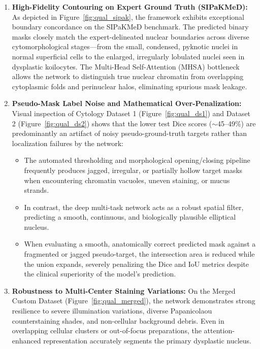 \documentclass[pdflatex,sn-nature]{sn-jnl}%
\theoremstyle{thmstyleone}%
\theoremstyle{thmstyletwo}%
\theoremstyle{thmstylethree}%
\begin{document}
\begin{enumerate}
    \item \textbf{High-Fidelity Contouring on Expert Ground Truth (SIPaKMeD):} 
    As depicted in Figure~\ref{fig:qual_sipak}, the framework exhibits exceptional boundary concordance on the SIPaKMeD benchmark. The predicted binary masks closely match the expert-delineated nuclear boundaries across diverse cytomorphological stages—from the small, condensed, pyknotic nuclei in normal superficial cells to the enlarged, irregularly lobulated nuclei seen in dysplastic koilocytes. The Multi-Head Self-Attention (MHSA) bottleneck allows the network to distinguish true nuclear chromatin from overlapping cytoplasmic folds and perinuclear halos, eliminating spurious mask leakage.

    \item \textbf{Pseudo-Mask Label Noise and Mathematical Over-Penalization:}
    Visual inspection of Cytology Dataset 1 (Figure~\ref{fig:qual_ds1}) and Dataset 2 (Figure~\ref{fig:qual_ds2}) shows that the lower test Dice scores ($\sim$45--49\%) are predominantly an artifact of noisy pseudo-ground-truth targets rather than localization failures by the network:
    \begin{itemize}
        \item The automated thresholding and morphological opening/closing pipeline frequently produces jagged, irregular, or partially hollow target masks when encountering chromatin vacuoles, uneven staining, or mucus strands.
        \item In contrast, the deep multi-task network acts as a robust spatial filter, predicting a smooth, continuous, and biologically plausible elliptical nucleus.
        \item When evaluating a smooth, anatomically correct predicted mask against a fragmented or jagged pseudo-target, the intersection area is reduced while the union expands, severely penalizing the Dice and IoU metrics despite the clinical superiority of the model's prediction.
    \end{itemize}

    \item \textbf{Robustness to Multi-Center Staining Variations:}
    On the Merged Custom Dataset (Figure~\ref{fig:qual_merged}), the network demonstrates strong resilience to severe illumination variations, diverse Papanicolaou counterstaining shades, and non-cellular background debris. Even in overlapping cellular clusters or out-of-focus preparations, the attention-enhanced representation accurately segments the primary dysplastic nucleus.


\end{enumerate}
\end{document}
